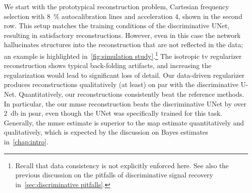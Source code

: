 We start with the prototypical reconstruction problem, Cartesian frequency selection with \qty{8}{\percent} autocalibration lines and acceleration \num{4}, shown in the second row.
This setup matches the training conditions of the discriminative UNet, resulting in satisfactory reconstructions.
However, even in this case the network hallucinates structures into the reconstruction that are not reflected in the data; an example is highlighted in~\cref{fig:simulation study}.\footnote{%
	Recall that data consistency is not explicitly enforced here.
	See also the previous discussion on the pitfalls of discriminative signal recovery in~\cref{sec:discriminative pitfalls}.
}
The isotropic \gls{tv} regularizer reconstruction shows typical back-folding artifacts, and increasing the regularization would lead to significant loss of detail.
Our data-driven regularizer produces reconstructions qualitatively (at least) on par with the discriminative U-Net.
Quantitatively, our reconstructions consistently beat the reference methods.
In particular, the our \gls{mmse} reconstruction beats the discriminative UNet by over \qty{2}{\decibel} in \gls{psnr}, even though the UNet was specifically trained for this task.
Generally, the \gls{mmse} estimate is superior to the \gls{map} estimate quantitatively and qualitatively, which is expected by the discussion on Bayes estimates in~\cref{chap:intro}.
